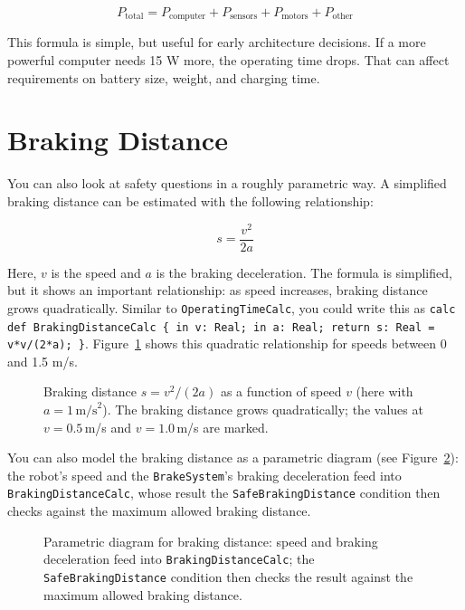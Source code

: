 \[
P_{\text{total}} = P_{\text{computer}} + P_{\text{sensors}} + P_{\text{motors}} + P_{\text{other}}
\]

This formula is simple, but useful for early architecture decisions. If a more powerful computer needs 15 W more, the operating time drops. That can affect requirements on battery size, weight, and charging time.

\section{Braking Distance}
You can also look at safety questions in a roughly parametric way. A simplified braking distance can be estimated with the following relationship:

\[
s = \frac{v^2}{2a}
\]

Here, \(v\) is the speed and \(a\) is the braking deceleration. The formula is simplified, but it shows an important relationship: as speed increases, braking distance grows quadratically. Similar to \texttt{OperatingTimeCalc}, you could write this as \texttt{calc def BrakingDistanceCalc \{ in v: Real; in a: Real; return s: Real = v*v/(2*a); \}}. Figure~\ref{fig:kap13-graph-bremsweg} shows this quadratic relationship for speeds between 0 and 1.5 m/s.

\begin{figure}[H]
  \centering
  \caption{Braking distance $s = v^2/(2a)$ as a function of speed $v$ (here with $a=1\,\text{m/s}^2$). The braking distance grows quadratically; the values at $v=0.5$\,m/s and $v=1.0$\,m/s are marked.}
  \label{fig:kap13-graph-bremsweg}
\end{figure}

You can also model the braking distance as a parametric diagram (see Figure~\ref{fig:kap13-parametrisch-bremsweg}): the robot's speed and the \texttt{BrakeSystem}'s braking deceleration feed into \texttt{BrakingDistanceCalc}, whose result the \texttt{SafeBrakingDistance} condition then checks against the maximum allowed braking distance.

\begin{figure}[H]
  \centering
  \caption{Parametric diagram for braking distance: speed and braking deceleration feed into \texttt{BrakingDistanceCalc}; the \texttt{SafeBrakingDistance} condition then checks the result against the maximum allowed braking distance.}
  \label{fig:kap13-parametrisch-bremsweg}
\end{figure}

